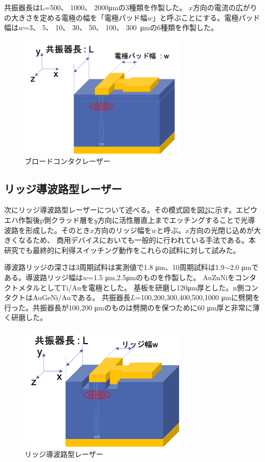 共振器長はL=500、 1000、 2000\si{ \micro\metre}の3種類を作製した。
$x$方向の電流の広がりの大きさを定める電極の幅を「電極パッド幅$w$」と呼ぶことにする。電極パッド幅は$w$=3、 5、 10、 30、 50、 100、 300\ \si{ \micro\metre}の6種類を作製した。

\begin{figure}[h]
	\centering
	\includegraphics[width=8cm]{figure/fig_2_1_broadcontact.png}
	\caption{ブロードコンタクレーザー}
	\label{fig:sample_broadcontact}
\end{figure}

\subsection{リッジ導波路型レーザー}%
次にリッジ導波路型レーザーについて述べる。その模式図を図\ref{fig_2_1_ridge}に示す。エピウエハ作製後p側クラッド層を$y$方向に活性層直上までエッチングすることで光導波路を形成した。そのとき$x$方向のリッジ幅を$w$と呼ぶ。$x$方向の光閉じ込めが大きくなるため、%
商用デバイスにおいても一般的に行われている手法である。本研究でも最終的に利得スイッチング動作をこれらの試料に対して試みた。

導波路リッジの深さは3周期試料は実測値で1.8 \si{\micro\metre}、10周期試料は1.9$\sim$2.0 \si{\micro\metre}である。導波路リッジ幅は$w$=1.5 \si{\micro\metre},2.5\si{\micro\metre}のものを作製した。
AuZnNiをコンタクトメタルとしてTi/Auを電極とした。
基板を研磨し120\si{ \micro\metre}厚とした。n側コンタクトはAuGeNi/Auである。
共振器長$L$=100,200,300,400,500,1000 \si{ \micro\metre}に劈開を行った。共振器長が100,200  \si{ \micro\metre}のものは劈開のを保つために60 \si{ \micro\metre}厚と非常に薄く研磨した。
\begin{figure}[h]
	\centering
	\includegraphics[width=8cm]{figure/fig_2_1_ridge.png}
	\caption{リッジ導波路型レーザー}
	\label{fig_2_1_ridge}
\end{figure}


